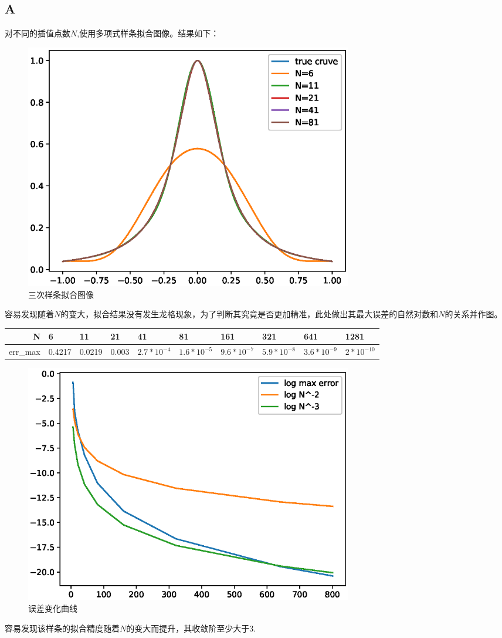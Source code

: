 \documentclass[12]{article}%
\begin{document}
    \subsection{A}
        对不同的插值点数$N$,使用多项式样条拟合图像。结果如下：
        \begin{figure}[H]
            \centering
            \includegraphics[width=0.7\textwidth]{../pic/A.eps}
            \caption{三次样条拟合图像}
        \end{figure}
        容易发现随着$N$的变大，拟合结果没有发生龙格现象，为了判断其究竟是否更加精准，此处做出其最大误差的自然对数和$N$的关系并作图。
        \begin{table}[]
            \begin{tabular}{|l|l|l|l|l|l|l|l|l|l|}
            \hline
            \multicolumn{1}{|r|}{N} & 6      & 11     & 21    & 41            & 81             & 161            & 321            & 641           & 1281           \\ \hline
            err\_max                & 0.4217 & 0.0219 & 0.003 & $2.7*10^{-4}$ & $1.6*10^{-5}$ & $9.6*10^{-7}$ & $5.9*10^{-8}$ & $3.6*10^{-9}$ & $2*10^{-10}$ \\ \hline
            \end{tabular}
            \end{table}
        \begin{figure}[H]
            \centering
            \includegraphics[width=0.7\textwidth]{../pic/A2.eps}
            \caption{误差变化曲线}
        \end{figure}
        容易发现该样条的拟合精度随着$N$的变大而提升，其收敛阶至少大于3.
    
\end{document}
